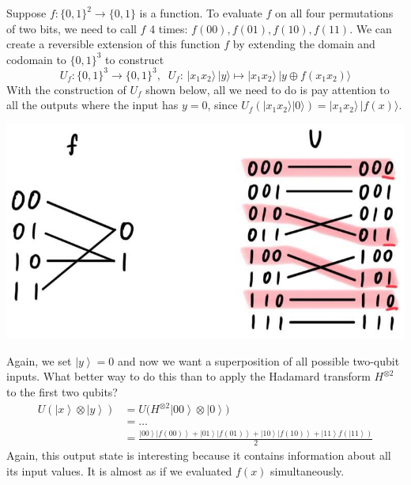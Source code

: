 \documentclass{article}
\newcommand{\ket}[1]{\ensuremath{\left|#1\right\rangle}}
\begin{document}
    \begin{example}
      Suppose $f: \{0, 1\}^2 \longrightarrow \{0, 1\}$ is a function. To evaluate $f$ on all four permutations of two bits, we need to call $f$ 4 times: $f(00), f(01), f(10), f(11)$. We can create a reversible extension of this function $f$ by extending the domain and codomain to $\{0, 1\}^3$ to construct
      \begin{equation} 
        U_f: \{0, 1\}^3 \longrightarrow \{0, 1\}^3, \;\; U_f: \, |x_1 x_2 \rangle\,|y\rangle \mapsto |x_1 x_2 \rangle\, |y \oplus f(x_1 x_2) \rangle
      \end{equation}
      With the construction of $U_f$ shown below, all we need to do is pay attention to all the outputs where the input has $y=0$, since $U_f (|x_1 x_2 \rangle |0\rangle) = |x_1 x_2 \rangle \, |f(x) \rangle$.
      \begin{center}
        \includegraphics[scale=0.3]{img/f_to_U_reversible.jpg}
      \end{center}
      Again, we set $\ket{y} = 0$ and now we want a superposition of all possible two-qubit inputs. What better way to do this than to apply the Hadamard transform $H^{\otimes 2}$ to the first two qubits? 
      \begin{align} 
        U (\ket{x} \otimes \ket{y}) & = U \big( H^{\otimes 2} \ket{00} \otimes \ket{0} \big) \\
                                    & = \ldots \\
                                    & = \frac{\ket{00} \ket{f(00)} + \ket{01} \ket{f(01)} + \ket{10} \ket{f(10)} + \ket{11} f(\ket{11})}{2}
      \end{align}
      Again, this output state is interesting because it contains information about all its input values. It is almost as if we evaluated $f(x)$ simultaneously.
    \end{example}
    
\end{document}
